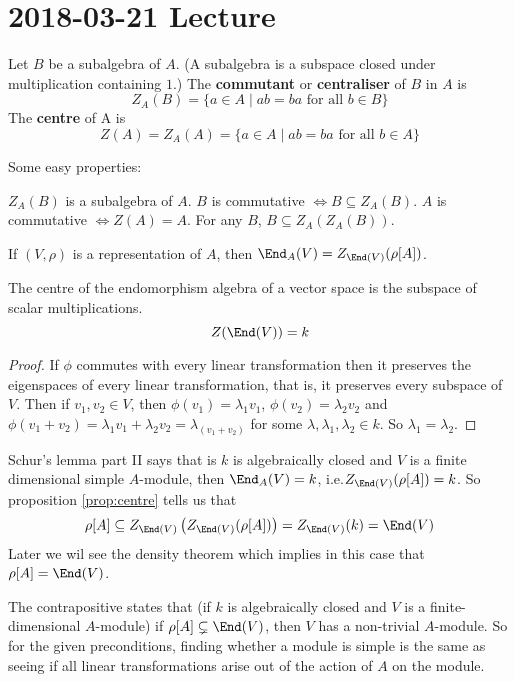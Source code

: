 \section{2018-03-21 Lecture}

\begin{defn}
	Let $B$ be a subalgebra of $A$.
	(A subalgebra is a subspace closed under multiplication containing $1$.)
	The \textbf{commutant} or \textbf{centraliser} of $B$ in $A$ is
	\[Z_A(B) = \{a \in A \mid ab=ba \text{ for all } b \in B\}\]
	The \textbf{centre} of A is
	\[Z(A) = Z_A(A) = \{a \in A \mid ab=ba \text{ for all } b \in A\}\]
\end{defn}

\begin{prop}\label{prop:centre}
	Some easy properties:
	\begin{itm}
		\io $Z_A(B)$ is a subalgebra of $A$.
		\io $B$ is commutative $\iff B \subseteq Z_A(B)$.
		\io $A$ is commutative $\iff Z(A)=A$.
		\io For any $B$, $B \subseteq Z_A(Z_A(B))$.
	\end{itm}
\end{prop}

\begin{exam}
	If $(V,\rho)$ is a representation of $A$, then $\End_A(V) = Z_{\End(V)}(\rho[A])$.
\end{exam}

\begin{lem}
	The centre of the endomorphism algebra of a vector space is the subspace of scalar multiplications.
	\[Z(\End(V))=k\]
\end{lem}

\begin{proof}
	If $\phi$ commutes with every linear transformation then it preserves the eigenspaces of every linear transformation, that is, it preserves every subspace of $V$.
	Then if $v_1,v_2 \in V$, then $\phi(v_1)=\lambda_1v_1$, $\phi(v_2)=\lambda_2v_2$ and $\phi(v_1+v_2)=\lambda_1v_1+\lambda_2v_2 = \lambda_(v_1+v_2)$ for some $\lambda,\lambda_1,\lambda_2 \in k$.
	So $\lambda_1=\lambda_2$.
\end{proof}

\begin{note}
	Schur's lemma part II says that is $k$ is algebraically closed and $V$ is a finite dimensional simple $A$-module, then $\End_A(V)=k$, i.e.\@ $Z_{\End(V)}(\rho[A])=k$.
	So proposition \ref{prop:centre} tells us that
	\[\rho[A] \subseteq Z_{\End(V)}\left(Z_{\End(V)}(\rho[A])\right) = Z_{\End(V)}(k) = \End(V)\]
	Later we wil see the density theorem which implies in this case that $\rho[A]=\End(V)$.
	
	The contrapositive states that (if $k$ is algebraically closed and $V$ is a finite-dimensional $A$-module) if $\rho[A] \subsetneq \End(V)$, then $V$ has a non-trivial $A$-module.
	So for the given preconditions, finding whether a module is simple is the same as seeing if all linear transformations arise out of the action of $A$ on the module.
\end{note}

